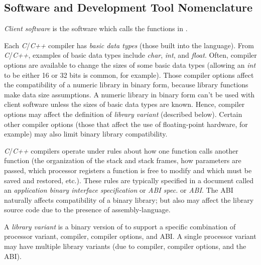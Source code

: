 \subsection{Software and Development Tool Nomenclature}
\label{ciov0:snom0:sdvt0}

\emph{Client software} is the 
software which calls the functions in 
\emph{\productbasenameshort{}}.  

Each \emph{C}/\emph{C++} compiler has \emph{basic data types} (those built into the 
language).  From \emph{C}/\emph{C++}, examples of basic data 
types include \emph{char}, \emph{int}, and \emph{float}.  
Often, compiler options are available to change the sizes of 
some basic data types (allowing an \emph{int} to be either 
16 or 32 bits is common, for example).  Those compiler 
options affect the compatibility of a numeric library in 
binary form, because library functions make data size 
assumptions.  A numeric library in binary form can't be used 
with client software unless the sizes of basic data types 
are known.  Hence, compiler options may affect the 
definition of \emph{library variant} (described below).  
Certain other compiler options (those that affect the use of 
floating-point hardware, for example) may also limit binary 
library compatibility.  

\emph{C}/\emph{C++} compilers operate under rules about how 
one function calls another function (the organization of the 
stack and stack frames, how parameters are passed, which 
processor registers a function is free to modify and which 
must be saved and restored, etc.).  These rules are 
typically specified in a document called an 
\emph{application binary 
interface specification} or \emph{ABI spec.} or 
\emph{ABI}\@.  The ABI naturally affects compatibility of a 
binary library; but also may affect the library source code 
due to the presence of assembly-language.  

A \emph{library variant} is a binary 
version of \emph{\productbasenameshort{}} to support a 
specific combination of processor variant, compiler, 
compiler options, and ABI\@.  A single processor variant may 
have multiple library variants (due to compiler, compiler 
options, and the ABI).  

